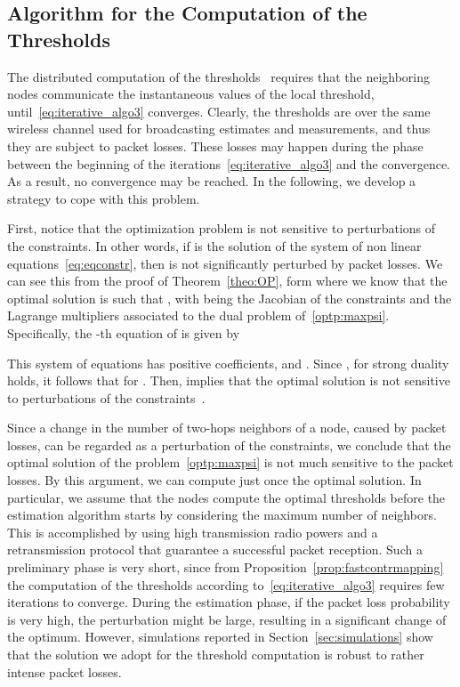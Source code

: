 \documentclass[a4paper,notitlepage,onecolumn]{article}
\numberwithin{equation}{section}
\begin{document}
\subsection{Algorithm for the Computation of the Thresholds}

The distributed computation of the thresholds~ requires that the
neighboring nodes communicate the instantaneous values of the
local threshold, until~\eqref{eq:iterative_algo3} converges.
Clearly, the thresholds are over the same wireless channel used
for broadcasting estimates and measurements, and thus they are
subject to packet losses. These losses may happen during the phase
between the beginning of the iterations~\eqref{eq:iterative_algo3}
and the convergence. As a result, no convergence may be reached.
In the following, we develop a strategy to cope with this problem.



First, notice that the optimization problem is not sensitive to
perturbations of the constraints. In other words, if 
is the solution of the system of non linear
equations~\eqref{eq:eqconstr}, then  is not
significantly perturbed by packet losses. We can see this from the
proof of Theorem~\ref{theo:OP}, form where we know that the
optimal solution is such that , with
 being the Jacobian of the constraints and 
the Lagrange multipliers associated to the dual problem
of~\eqref{optp:maxpsi}. Specifically, the -th equation of
 is given by

This system of equations has positive coefficients, and
. Since , for strong duality holds, it follows that 
for . Then,  implies that the optimal
solution is not sensitive to perturbations of the
constraints~\cite[pag. 249]{boyd2}.

Since a change in the number of two-hops neighbors of a node,
caused by packet losses, can be regarded as a perturbation of the
constraints, we conclude that the optimal solution of the
problem~\eqref{optp:maxpsi} is not much sensitive to the packet
losses. By this argument, we can compute just once the optimal
solution. In particular, we assume that the nodes compute the
optimal thresholds before the estimation algorithm starts by
considering the maximum number of neighbors. This is accomplished
by using high transmission radio powers and a retransmission
protocol that guarantee a successful packet reception. Such a
preliminary phase is very short, since from
Proposition~\ref{prop:fastcontrmapping} the computation of the
thresholds according to~\eqref{eq:iterative_algo3} requires few
iterations to converge.
During the estimation phase, if the packet loss probability is
very high, the perturbation might be large, resulting in a
significant change of the optimum. However, simulations reported
in Section~\ref{sec:simulations} show that the solution we adopt
for the threshold computation is robust to rather intense packet
losses.
\end{document}
